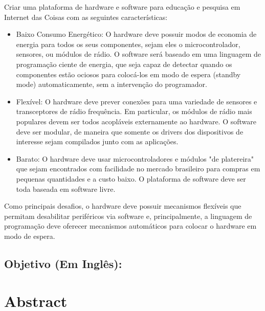 \documentclass[titlepage,12pt]{article}
\begin{document}
Criar uma plataforma de hardware e software para educação e pesquisa em
Internet das Coisas com as seguintes características:

\begin{itemize}
%
\item Baixo Consumo Energético:
  O hardware deve possuir modos de economia de energia para todos os seus
  componentes, sejam eles o microcontrolador, sensores, ou módulos de rádio.
  O software será baseado em uma linguagem de programação ciente de energia,
  que seja capaz de detectar quando os componentes estão ociosos para
  colocá-los em modo de espera (standby mode) automaticamente, sem a
  intervenção do programador.
%
\item Flexível:
  O hardware deve prever conexões para uma variedade de sensores e
  transceptores de rádio frequência.
  Em particular, os módulos de rádio mais populares devem ser todos acopláveis
  externamente ao hardware.
  O software deve ser modular, de maneira que somente os drivers dos
  dispositivos de interesse sejam compilados junto com as aplicações.
%
\item Barato:
  O hardware deve usar microcontroladores e módulos "de platereira" que sejam
  encontrados com facilidade no mercado brasileiro para compras em pequenas
  quantidades e a custo baixo.
  O plataforma de software deve ser toda baseada em software livre.
%
\end{itemize}

Como principais desafios, o hardware deve possuir mecanismos flexíveis que
permitam desabilitar periféricos via software e, principalmente, a linguagem de
programação deve oferecer mecanismos automáticos para colocar o hardware em
modo de espera.

\begin{comment}
O enfoque principal se dá no baixo consumo energético, mas a flexibilidade e
baixo custo são fundamentais para promover uma maior adoção da plataforma,
principalmente no contexto de pesquisa em IoT.
\end{comment}

\subsection{ Objetivo (Em Inglês): }


\section{ Abstract }
\end{document}
